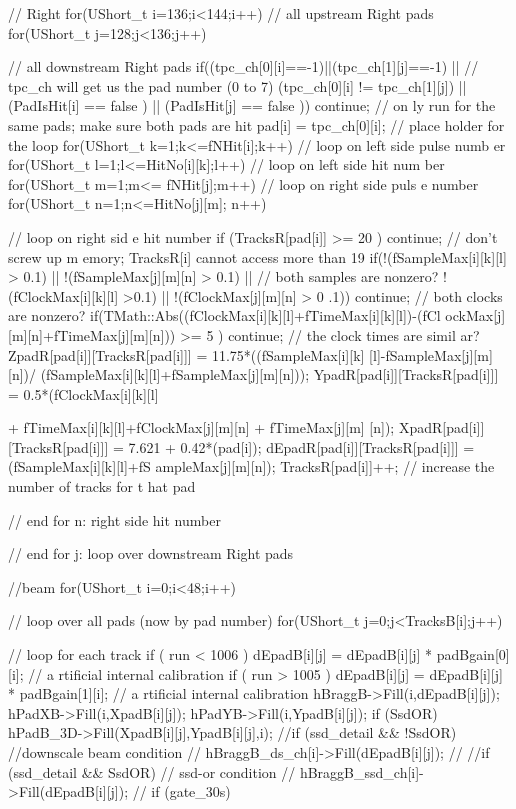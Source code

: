 \begin{DoxyCode}
{{{{{{{{{{          // Right
          for(UShort_t i=136;i<144;i++) // all upstream Right pads
            for(UShort_t j=128;j<136;j++){ // all downstream Right pads
              if((tpc_ch[0][i]==-1)||(tpc_ch[1][j]==-1) || // tpc_ch will get us 
      the pad number (0 to 7)
              (tpc_ch[0][i] != tpc_ch[1][j]) || 
              (PadIsHit[i] == false ) || (PadIsHit[j] == false )) continue; // on
      ly run for the same pads; make sure both pads are hit
                pad[i] = tpc_ch[0][i]; // place holder for the loop
                for(UShort_t k=1;k<=fNHit[i];k++) // loop on left side pulse numb
      er
                for(UShort_t l=1;l<=HitNo[i][k];l++) // loop on left side hit num
      ber
                    for(UShort_t m=1;m<= fNHit[j];m++) // loop on right side puls
      e number
                      for(UShort_t n=1;n<=HitNo[j][m]; n++){ // loop on right sid
      e hit number
                        if (TracksR[pad[i]] >= 20 ) continue; // don't screw up m
      emory; TracksR[i] cannot access more than 19
                        if(!(fSampleMax[i][k][l] > 0.1) || !(fSampleMax[j][m][n] 
      > 0.1)  || // both samples are nonzero?
                           !(fClockMax[i][k][l] >0.1) || !(fClockMax[j][m][n] > 0
      .1)) continue;  // both clocks are nonzero?
                        if(TMath::Abs((fClockMax[i][k][l]+fTimeMax[i][k][l])-(fCl
      ockMax[j][m][n]+fTimeMax[j][m][n])) >= 5 ) continue; // the clock times are simil
      ar?
                        ZpadR[pad[i]][TracksR[pad[i]]] = 11.75*((fSampleMax[i][k]
      [l]-fSampleMax[j][m][n])/
                          (fSampleMax[i][k][l]+fSampleMax[j][m][n]));
                        YpadR[pad[i]][TracksR[pad[i]]] = 0.5*(fClockMax[i][k][l] 
      
                          + fTimeMax[i][k][l]+fClockMax[j][m][n] + fTimeMax[j][m]
      [n]);
                        XpadR[pad[i]][TracksR[pad[i]]] = 7.621 + 0.42*(pad[i]); 
                        dEpadR[pad[i]][TracksR[pad[i]]] = (fSampleMax[i][k][l]+fS
      ampleMax[j][m][n]);
                        TracksR[pad[i]]++; // increase the number of tracks for t
      hat pad
                    } // end for n: right side hit number
            } // end for j: loop over downstream Right pads 
          
          //beam
          for(UShort_t i=0;i<48;i++){ // loop over all pads (now by pad number)
            for(UShort_t j=0;j<TracksB[i];j++){ // loop for each track
             if ( run < 1006 ) dEpadB[i][j] = dEpadB[i][j] * padBgain[0][i]; // a
      rtificial internal calibration
             if ( run > 1005 ) dEpadB[i][j] = dEpadB[i][j] * padBgain[1][i]; // a
      rtificial internal calibration
             hBraggB->Fill(i,dEpadB[i][j]);
             hPadXB->Fill(i,XpadB[i][j]);
             hPadYB->Fill(i,YpadB[i][j]);
             if (SsdOR) hPadB_3D->Fill(XpadB[i][j],YpadB[i][j],i);
               //if (ssd_detail && !SsdOR) { //downscale beam condition
               //  hBraggB_ds_ch[i]->Fill(dEpadB[i][j]);
               //}
               //if (ssd_detail && SsdOR) { // ssd-or condition
               //  hBraggB_ssd_ch[i]->Fill(dEpadB[i][j]);
               //}
             if (gate_30s) {
               
}}}}}}}}}}}}}
\end{DoxyCode}
